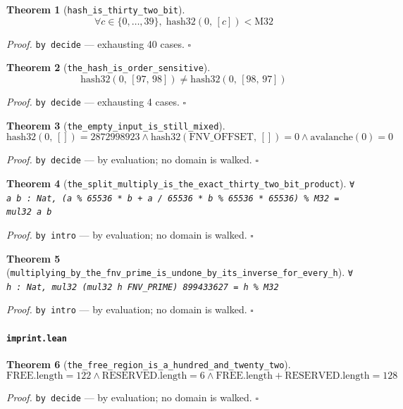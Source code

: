 \documentclass[11pt]{article}
\newtheorem{theorem}{Theorem}[section]
\begin{document}
\begin{theorem}[\texttt{hash\_is\_thirty\_two\_bit}]
\[ \forall c \in \{0,\dots,39\},\; \mathrm{hash32}\mathopen{}\left(0,\,[c]\right) < \mathrm{M32} \]
\end{theorem}
\noindent\emph{Proof.} \texttt{by decide} --- exhausting 40 cases. \hfill$\square$

\begin{theorem}[\texttt{the\_hash\_is\_order\_sensitive}]
\[ \mathrm{hash32}\mathopen{}\left(0,\,[97,\,98]\right) \neq \mathrm{hash32}\mathopen{}\left(0,\,[98,\,97]\right) \]
\end{theorem}
\noindent\emph{Proof.} \texttt{by decide} --- exhausting 4 cases. \hfill$\square$

\begin{theorem}[\texttt{the\_empty\_input\_is\_still\_mixed}]
\[ \mathrm{hash32}\mathopen{}\left(0,\,[]\right) = 2872998923 \land \mathrm{hash32}\mathopen{}\left(\mathrm{FNV\_OFFSET},\,[]\right) = 0 \land \mathrm{avalanche}\mathopen{}\left(0\right) = 0 \]
\end{theorem}
\noindent\emph{Proof.} \texttt{by decide} --- by evaluation; no domain is walked. \hfill$\square$

\begin{theorem}[\texttt{the\_split\_multiply\_is\_the\_exact\_thirty\_two\_bit\_product}]
\texttt{∀ a b : Nat, (a \% 65536 * b + a / 65536 * b \% 65536 * 65536) \% M32 = mul32 a b}
\end{theorem}
\noindent\emph{Proof.} \texttt{by
  intro} --- by evaluation; no domain is walked. \hfill$\square$

\begin{theorem}[\texttt{multiplying\_by\_the\_fnv\_prime\_is\_undone\_by\_its\_inverse\_for\_every\_h}]
\texttt{∀ h : Nat, mul32 (mul32 h FNV\_PRIME) 899433627 = h \% M32}
\end{theorem}
\noindent\emph{Proof.} \texttt{by
  intro} --- by evaluation; no domain is walked. \hfill$\square$

\paragraph{\texttt{imprint.lean}}

\begin{theorem}[\texttt{the\_free\_region\_is\_a\_hundred\_and\_twenty\_two}]
\[ \mathrm{FREE.length} = 122 \land \mathrm{RESERVED.length} = 6 \land \mathrm{FREE.length} + \mathrm{RESERVED.length} = 128 \]
\end{theorem}
\noindent\emph{Proof.} \texttt{by decide} --- by evaluation; no domain is walked. \hfill$\square$
\end{document}
